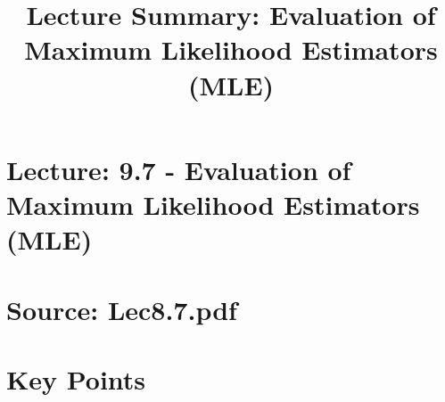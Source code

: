 \documentclass{article}
\title{Lecture Summary: Evaluation of Maximum Likelihood Estimators (MLE)}
\author{}
\date{}
\begin{document}
\maketitle

\section*{Lecture: 9.7 - Evaluation of Maximum Likelihood Estimators (MLE)}
\section*{Source: Lec8.7.pdf}

\section*{Key Points}
\end{document}
